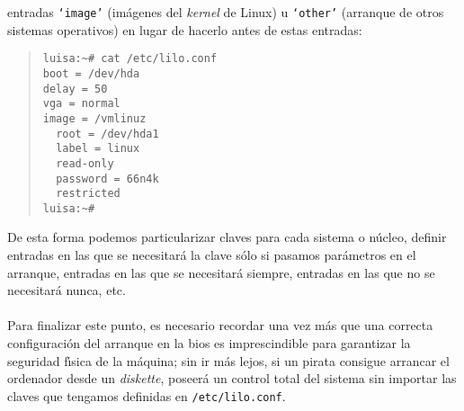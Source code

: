 entradas {\tt `image'} (im\'agenes del {\it kernel} de Linux) u {\tt `other'} 
(arranque de otros sistemas operativos) en lugar de hacerlo antes de estas
entradas:
\begin{quote}
\begin{verbatim}
luisa:~# cat /etc/lilo.conf
boot = /dev/hda
delay = 50
vga = normal
image = /vmlinuz
  root = /dev/hda1
  label = linux
  read-only
  password = 66n4k
  restricted
luisa:~#
\end{verbatim}
\end{quote}
De esta forma podemos particularizar claves para cada sistema o n\'ucleo, 
definir entradas en las que se necesitar\'a la clave s\'olo si pasamos 
par\'ametros en el arranque, entradas en las que se necesitar\'a siempre, 
entradas en las que no se necesitar\'a nunca, etc.\\
\\Para finalizar este punto, es necesario recordar una vez m\'as que una 
correcta configuraci\'on del arranque en la {\sc bios} es imprescindible para
garantizar la seguridad f\'{\i}sica de la m\'aquina; sin ir m\'as lejos, si un
pirata consigue arrancar el ordenador desde un {\it diskette}, poseer\'a un
control total del sistema sin importar las claves que tengamos definidas en
{\tt /etc/lilo.conf}.
